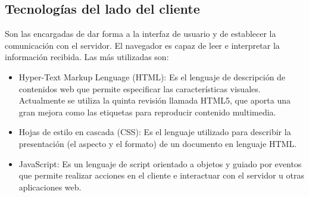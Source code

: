 \subsection{Tecnologías del lado del cliente}
Son las encargadas de dar forma a la interfaz de usuario y de establecer la comunicación con el servidor. El navegador es capaz de leer e interpretar la información recibida. Las más utilizadas son:
\begin{itemize}
	\item Hyper-Text Markup Lenguage (HTML): Es el lenguaje de descripción de contenidos web que permite especificar las características visuales. Actualmente se utiliza la quinta revisión llamada HTML5, que aporta una gran mejora como las etiquetas para reproducir contenido multimedia.
	\item Hojas de estilo en cascada (CSS): Es el lenguaje utilizado para describir la presentación (el aspecto y el formato) de un documento en lenguaje HTML.
	\item JavaScript: Es un lenguaje de script orientado a objetos y guiado por eventos que permite realizar acciones en el cliente e interactuar con el servidor u otras aplicaciones web.
\end{itemize}


